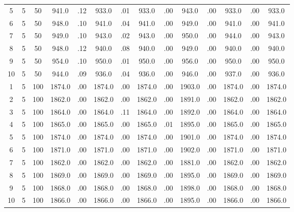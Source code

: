 \documentclass[12pt,a4paper]{article}
\begin{document}
\begin{center}
{\begin{tabular}{|ccc|cc|cc|cc|cc|cc|c|}
5             &   5&  50&    941.0&  .12&    933.0&  .01&    933.0&  .00&    943.0&  .00&    933.0&  .00&    933.0\\[-0.01in]
6             &   5&  50&    948.0&  .10&    941.0&  .04&    941.0&  .00&    949.0&  .00&    941.0&  .00&    941.0\\[-0.01in]
7             &   5&  50&    949.0&  .10&    943.0&  .02&    943.0&  .00&    950.0&  .00&    944.0&  .00&    943.0\\[-0.01in]
8             &   5&  50&    948.0&  .12&    940.0&  .08&    940.0&  .00&    949.0&  .00&    940.0&  .00&    940.0\\[-0.01in]
9             &   5&  50&    954.0&  .10&    950.0&  .01&    950.0&  .00&    956.0&  .00&    950.0&  .00&    950.0\\[-0.01in]
10            &   5&  50&    944.0&  .09&    936.0&  .04&    936.0&  .00&    946.0&  .00&    937.0&  .00&    936.0\\[-0.01in]
1             &   5& 100&   1874.0&  .00&   1874.0&  .00&   1874.0&  .00&   1903.0&  .00&   1874.0&  .00&   1874.0\\[-0.01in]
2             &   5& 100&   1862.0&  .00&   1862.0&  .00&   1862.0&  .00&   1891.0&  .00&   1862.0&  .00&   1862.0\\[-0.01in]
3             &   5& 100&   1864.0&  .00&   1864.0&  .11&   1864.0&  .00&   1892.0&  .00&   1864.0&  .00&   1864.0\\[-0.01in]
4             &   5& 100&   1865.0&  .00&   1865.0&  .00&   1865.0&  .01&   1895.0&  .00&   1865.0&  .00&   1865.0\\[-0.01in]
5             &   5& 100&   1874.0&  .00&   1874.0&  .00&   1874.0&  .00&   1901.0&  .00&   1874.0&  .00&   1874.0\\[-0.01in]
6             &   5& 100&   1871.0&  .00&   1871.0&  .00&   1871.0&  .00&   1902.0&  .00&   1871.0&  .00&   1871.0\\[-0.01in]
7             &   5& 100&   1862.0&  .00&   1862.0&  .00&   1862.0&  .00&   1881.0&  .00&   1862.0&  .00&   1862.0\\[-0.01in]
8             &   5& 100&   1869.0&  .00&   1869.0&  .00&   1869.0&  .00&   1895.0&  .00&   1869.0&  .00&   1869.0\\[-0.01in]
9             &   5& 100&   1868.0&  .00&   1868.0&  .00&   1868.0&  .00&   1898.0&  .00&   1868.0&  .00&   1868.0\\[-0.01in]
10            &   5& 100&   1866.0&  .00&   1866.0&  .00&   1866.0&  .00&   1895.0&  .00&   1866.0&  .00&   1866.0\\[-0.01in]

\end{tabular}}
\end{center}
\end{document}
